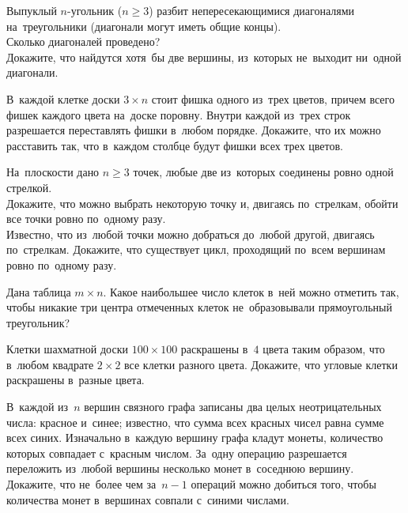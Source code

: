 


\begin{problems}

\item
Выпуклый $n$-угольник ($n \geq 3$) разбит непересекающимися диагоналями
на~треугольники (диагонали могут иметь общие концы).
\\
\subproblem
Сколько диагоналей проведено?
\\
\subproblem
Докажите, что найдутся хотя~бы две вершины, из~которых не~выходит ни~одной
диагонали.

\item
В~каждой клетке доски $3 \times n$ стоит фишка одного из~трех цветов, причем
всего фишек каждого цвета на~доске поровну.
Внутри каждой из~трех строк разрешается переставлять фишки в~любом порядке.
Докажите, что их можно расставить так, что в~каждом столбце будут фишки всех
трех цветов.

\item
На~плоскости дано $n \geqslant 3$ точек, любые две из~которых соединены ровно
одной стрелкой.
\\
\subproblem
Докажите, что можно выбрать некоторую точку и, двигаясь по~стрелкам, обойти все
точки ровно по~одному разу.
\\
\subproblem
Известно, что из~любой точки можно добраться до~любой другой, двигаясь
по~стрелкам.
Докажите, что существует цикл, проходящий по~всем вершинам ровно по~одному
разу.

\item
Дана таблица $m \times n$.
Какое наибольшее число клеток в~ней можно отметить так, чтобы никакие три
центра отмеченных клеток не~образовывали прямоугольный треугольник?

\item
Клетки шахматной доски $100 \times 100$ раскрашены в~$4$ цвета таким образом,
что в~любом квадрате $2 \times 2$ все клетки разного цвета.
Докажите, что угловые клетки раскрашены в~разные цвета.

\item
В~каждой из~$n$ вершин связного графа записаны два целых неотрицательных числа:
красное и~синее;
известно, что сумма всех красных чисел равна сумме всех синих.
Изначально в~каждую вершину графа кладут монеты, количество которых совпадает
с~красным числом.
За~одну операцию разрешается переложить из~любой вершины несколько монет
в~соседнюю вершину.
Докажите, что не~более чем за~$n - 1$ операций можно добиться того, чтобы
количества монет в~вершинах совпали с~синими числами.


\end{problems}
